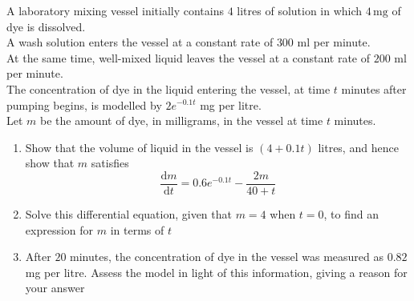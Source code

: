 \documentclass[leqno]{article}
\begin{document}
\begin{enumerate}[
  label=\textbf{\arabic*.},
  leftmargin=*,
  topsep=0pt,
  partopsep=0pt,
  parsep=0pt
]
\newpage

\questionitem

A laboratory mixing vessel initially contains $4$ litres of solution in which $4\,\mathrm{mg}$ of dye is dissolved. \\

A wash solution enters the vessel at a constant rate of $300$ ml per minute. \\

At the same time, well-mixed liquid leaves the vessel at a constant rate of $200$ ml per minute. \\

The concentration of dye in the liquid entering the vessel, at time $t$ minutes after pumping begins, is modelled by $2e^{-0.1t}$ mg per litre. \\

Let $m$ be the amount of dye, in milligrams, in the vessel at time $t$ minutes. \\

\begin{enumerate}[label=\textbf{(\alph*)}]
  \item Show that the volume of liquid in the vessel is $(4+0.1t)$ litres, and hence show that $m$ satisfies
  \[
  \frac{\mathrm{d}m}{\mathrm{d}t}=0.6e^{-0.1t}-\frac{2m}{40+t}
  \] 
  \item Solve this differential equation, given that $m=4$ when $t=0$, to find an expression for $m$ in terms of $t$  \\
  \item After $20$ minutes, the concentration of dye in the vessel was measured as $0.82$ mg per litre. Assess the model in light of this information, giving a reason for your answer  \\
\end{enumerate}

\newpage

\questionitem


\end{enumerate}
\end{document}
